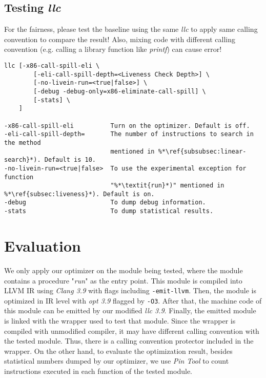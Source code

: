 \documentclass[acmsmall]{acmart}
\begin{document}
\subsection{Testing \textit{llc}}
For the fairness, please test the baseline using the same \textit{llc} to apply same calling convention to compare the result! Also, mixing code with different calling convention (e.g. calling a library function like \textit{printf}) can cause error!

\begin{lstlisting}
llc [-x86-call-spill-eli \
		[-eli-call-spill-depth=<Liveness Check Depth>] \
		[-no-livein-run=<true|false>] \
		[-debug -debug-only=x86-eliminate-call-spill] \
		[-stats] \
    ]

-x86-call-spill-eli          Turn on the optimizer. Default is off.
-eli-call-spill-depth=       The number of instructions to search in the method 
                             mentioned in %*\ref{subsubsec:linear-search}*). Default is 10.
-no-livein-run=<true|false>  To use the experimental exception for function 
                             "%*\textit{run}*)" mentioned in %*\ref{subsec:liveness}*). Default is on.
-debug                       To dump debug information.
-stats                       To dump statistical results.
\end{lstlisting}

\section{Evaluation}
We only apply our optimizer on the module being tested, where the module contains a procedure "\textit{run}" as the entry point. This module is compiled into LLVM IR using \textit{Clang 3.9} with flags including \texttt{-emit-llvm}. Then, the module is optimized in IR level with \textit{opt 3.9} flagged by \texttt{-O3}. After that, the machine code of this module can be emitted by our modified \textit{llc 3.9}. Finally, the emitted module is linked with the wrapper used to test that module. Since the wrapper is compiled with unmodified compiler, it may have different calling convention with the tested module. Thus, there is a calling convention protector included in the wrapper. On the other hand, to evaluate the optimization result, besides statistical numbers dumped by our optimizer, we use \textit{Pin Tool} to count instructions executed in each function of the tested module.
\end{document}
